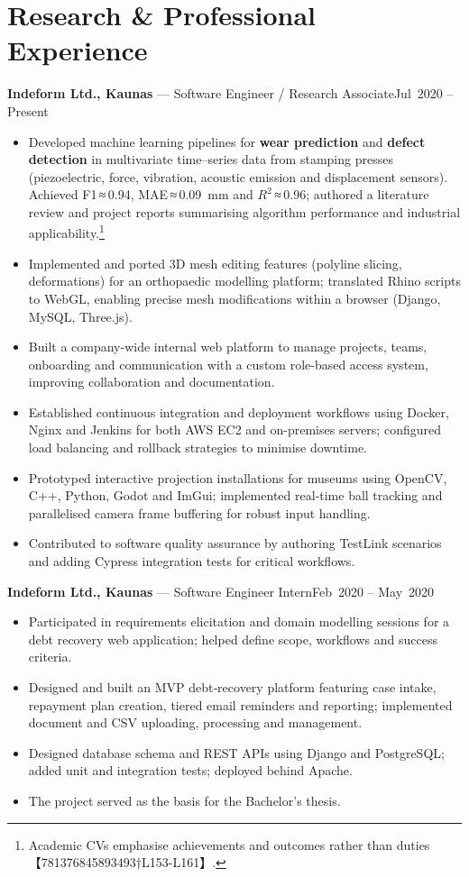 \documentclass[10pt,a4paper]{article}
\newcommand{\entry}[3]{\noindent\textbf{#1} — #2\hfill #3\\}
\begin{document}
\section*{Research \& Professional Experience}
\entry{Indeform Ltd., Kaunas}{Software Engineer / Research Associate}{Jul 2020 -- Present}
\begin{itemize}[leftmargin=*, topsep=0em]
  \item Developed machine learning pipelines for \textbf{wear prediction} and \textbf{defect detection} in multivariate time–series data from stamping presses (piezoelectric, force, vibration, acoustic emission and displacement sensors). Achieved F1\,≈\,0.94, MAE\,≈\,0.09~mm and $R^2$\,≈\,0.96; authored a literature review and project reports summarising algorithm performance and industrial applicability.\footnote{Academic CVs emphasise achievements and outcomes rather than duties【781376845893493†L153-L161】.}
  \item Implemented and ported 3D mesh editing features (polyline slicing, deformations) for an orthopaedic modelling platform; translated Rhino scripts to WebGL, enabling precise mesh modifications within a browser (Django, MySQL, Three.js).
  \item Built a company-wide internal web platform to manage projects, teams, onboarding and communication with a custom role-based access system, improving collaboration and documentation.
  \item Established continuous integration and deployment workflows using Docker, Nginx and Jenkins for both AWS EC2 and on-premises servers; configured load balancing and rollback strategies to minimise downtime.
  \item Prototyped interactive projection installations for museums using OpenCV, C++, Python, Godot and ImGui; implemented real‑time ball tracking and parallelised camera frame buffering for robust input handling.
  \item Contributed to software quality assurance by authoring TestLink scenarios and adding Cypress integration tests for critical workflows.
\end{itemize}

\entry{Indeform Ltd., Kaunas}{Software Engineer Intern}{Feb 2020 -- May 2020}
\begin{itemize}[leftmargin=*, topsep=0em]
  \item Participated in requirements elicitation and domain modelling sessions for a debt recovery web application; helped define scope, workflows and success criteria.
  \item Designed and built an MVP debt‑recovery platform featuring case intake, repayment plan creation, tiered email reminders and reporting; implemented document and CSV uploading, processing and management.
  \item Designed database schema and REST APIs using Django and PostgreSQL; added unit and integration tests; deployed behind Apache.
  \item The project served as the basis for the Bachelor’s thesis.
\end{itemize}
\end{document}
